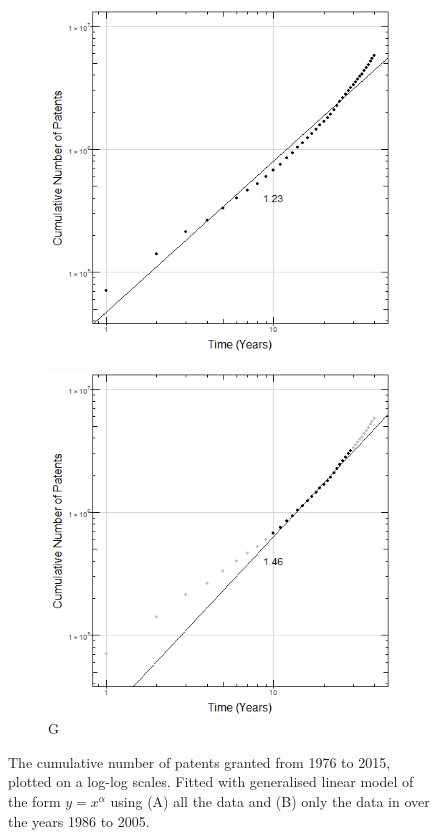 \begin{figure}
\centering
\begin{subfigure}{.5\textwidth}
  \centering
  \includegraphics[width=0.7\linewidth]{Figures/CumulativePatents1}
 \caption[CumPatents1]{\small}
\label{fig:CumPatents1}
\end{subfigure}%
\begin{subfigure}{.5\textwidth}
  \centering
  \includegraphics[width=0.7\linewidth]{Figures/CumulativePatents2}
  \caption[CumPatents1]{\small G}
\label{fig:CumPatents2}
\end{subfigure}
\caption[Power-law fit for cumulative number of patents granted each year]{The cumulative number of patents granted from 1976 to 2015, plotted on a log-log scales. Fitted with generalised linear model of the form $y = x^{\alpha}$ using (A) all the data and (B) only the data in over the years 1986 to 2005.}
\label{fig:CumPatents}
\end{figure}

